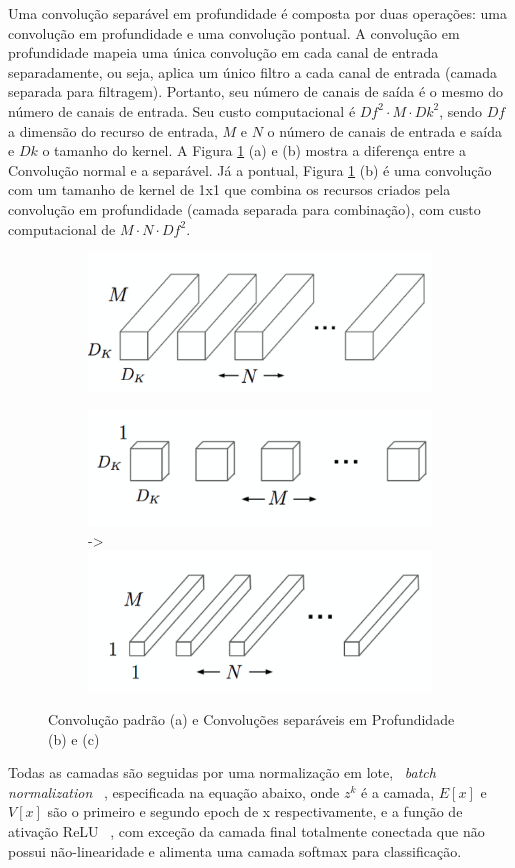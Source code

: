 \documentclass{bmvc2k}
\begin{document}
Uma convolução separável em profundidade é composta por duas operações: uma convolução em profundidade e uma convolução pontual. A convolução em profundidade mapeia uma única convolução em cada canal de entrada separadamente, ou seja, aplica um único filtro a cada canal de entrada (camada  separada para filtragem). Portanto, seu número de canais de saída é o mesmo do número de canais de entrada. Seu custo computacional é $Df^2 \cdot M \cdot Dk^2$, sendo $Df$ a dimensão do recurso de entrada, $M$ e $N$ o número de canais de entrada e saída e $Dk$ o tamanho do kernel. A Figura \ref{MN} (a) e (b)
mostra a diferença entre a Convolução normal e a separável. Já a pontual, Figura \ref{MN} (b) é uma convolução com um tamanho de kernel de 1x1 que combina os recursos criados pela convolução em profundidade (camada separada para combinação), com custo computacional de $M \cdot N \cdot Df^2$.


\begin{figure}[h]
\centering
    \begin{subfigure}[]
        \centering
         \includegraphics[width=0.4\linewidth]{imagens/mn1.png} 
    \end{subfigure}

    \begin{subfigure}[]
    \centering
         \includegraphics[width=0.4\linewidth]{imagens/mn2.png} ->
         \includegraphics[width=0.4\linewidth]{imagens/mn3.png}
    \end{subfigure}
    \label{MN}
    \caption{Convolução padrão (a) e Convoluções separáveis em Profundidade (b) e (c)~\cite{mobilenets}}
\end{figure}


Todas as camadas são seguidas por uma normalização em lote, ~\textit{batch normalization}
~\cite{batch}, especificada na equação abaixo, onde $z^k$ é a camada, $E[x]$ e $V[x]$ são o primeiro e segundo epoch de x respectivamente, e  a função de ativação ReLU ~\cite{relu}, com exceção da camada final totalmente conectada que não possui não-linearidade e alimenta uma camada softmax para classificação.
\end{document}
